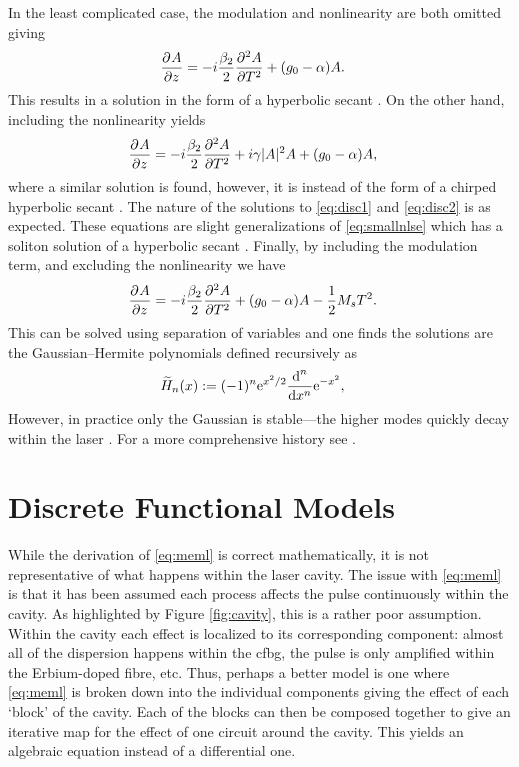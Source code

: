 In the least complicated case, the modulation and nonlinearity are both omitted giving
\begin{align}
\pdiff{A}{z} &= - i \frac{\beta_2}{2}\pdiff[2]{A}{T} + \left( g_0 - \alpha \right) A.
\label{eq:disc1}
\end{align}
This results in a solution in the form of a hyperbolic secant \cite{haus1975, haus1986, haus1992}. On the other hand, including the nonlinearity yields
\begin{align}
\pdiff{A}{z} &= - i \frac{\beta_2}{2}\pdiff[2]{A}{T} + i \gamma |A|^2 A + \left( g_0 - \alpha \right) A,
\label{eq:disc2}
\end{align}
where a similar solution is found, however, it is instead of the form of a chirped hyperbolic secant \cite{haus1991, usechak}. The nature of the solutions to \eqref{eq:disc1} and \eqref{eq:disc2} is as expected. These equations are slight generalizations of \eqref{eq:smallnlse} which has a soliton solution of a hyperbolic secant \cite{ferreira}. Finally, by including the modulation term, and excluding the nonlinearity we have
\begin{align}
\pdiff{A}{z} &= - i \frac{\beta_2}{2}\pdiff[2]{A}{T} + \left( g_0 - \alpha \right) A - \frac{1}{2}M_s T^2.
\end{align}
This can be solved using separation of variables and one finds the solutions are the Gaussian--Hermite polynomials \cite{burgoyne2014, hausbook, haus1975, haus1996, haus2000, kartner, tamura1996, usechak} defined recursively as
\begin{align}
\Her{n}{x} &:= (-1)^n \textrm{e}^{x^2 / 2} \diff[n]{}{x} \textrm{e}^{-x^2},
\label{eq:gaussherm}
\end{align}
However, in practice only the Gaussian is stable---the higher modes quickly decay within the laser \cite{hausbook, haus1975, haus1996, haus2000}. For a more comprehensive history see \cite{haus2000}. \\

\section{Discrete Functional Models}
\label{sec:discrete}
While the derivation of \eqref{eq:meml} is correct mathematically, it is not representative of what happens within the laser cavity. The issue with \eqref{eq:meml} is that it has been assumed each process affects the pulse continuously within the cavity. As highlighted by Figure \ref{fig:cavity}, this is a rather poor assumption. Within the cavity each effect is localized to its corresponding component: almost all of the dispersion happens within the \gls{cfbg}, the pulse is only amplified within the Erbium-doped fibre, etc. Thus, perhaps a better model is one where \eqref{eq:meml} is broken down into the individual components giving the effect of each `block' of the cavity. Each of the blocks can then be composed together to give an iterative map for the effect of one circuit around the cavity. This yields an algebraic equation instead of a differential one. \\

